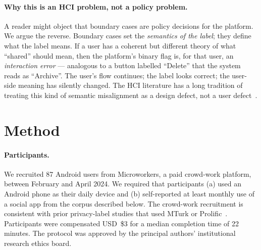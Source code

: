 \documentclass[11pt,a4paper]{article}
\makeatletter
\let\@oldsection\section
\renewcommand{\section}{\FloatBarrier\@oldsection}
\makeatother
\begin{document}


\paragraph{Why this is an HCI problem, not a policy problem.}
A reader might object that boundary cases are policy decisions for
the platform. We argue the reverse. Boundary cases set the
\emph{semantics of the label}; they define what the label means. If
a user has a coherent but different theory of what ``shared'' should
mean, then the platform's binary flag is, for that user, an
\emph{interaction error} --- analogous to a button labelled
``Delete'' that the system reads as ``Archive''. The user's flow
continues; the label looks correct; the user-side meaning has
silently changed. The HCI literature has a long tradition of
treating this kind of semantic misalignment as a design defect, not
a user defect~\citep{schaub:etal:2015,schaub:etal:2017,
almuhimedi:etal:2015,habib:etal:2020,habib:etal:2022,
egelman:etal:2009,egelman:etal:2013}.

\section{Method}\label{sec:method}

\paragraph{Participants.}
We recruited 87 Android users from Microworkers, a paid crowd-work
platform, between February and April 2024. We required that
participants (a) used an Android phone as their daily device and (b)
self-reported at least monthly use of a social app from the corpus
described below. The crowd-work recruitment is consistent with prior
privacy-label studies that used MTurk or
Prolific~\citep{kelley:etal:2013,redmiles:etal:2017,naeini:etal:2017,
ur:etal:2012,rao:etal:2016}. Participants were compensated USD~\$3
for a median completion time of 22 minutes. The protocol was
approved by the principal authors' institutional research ethics
board.
\end{document}
